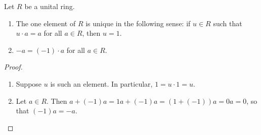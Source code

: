 \documentclass{article}
\begin{document}
\begin{prop}
Let $R$ be a unital ring.
\begin{enumerate}
\item The one element of $R$ is unique in the following sense: if $u \in R$ such that $u \cdot a = a$ for all $a \in R$, then $u = 1$.
\item $-a = (-1) \cdot a$ for all $a \in R$.
\end{enumerate}
\end{prop}

\begin{proof}
\begin{enumerate}
\item Suppose $u$ is such an element. In particular, $1 = u \cdot 1 = u$.
\item Let $a \in R$. Then $a + (-1)a = 1a + (-1)a = (1 + (-1))a = 0a = 0$, so that $(-1)a = -a$.
\end{enumerate}
\end{proof}
\end{document}
